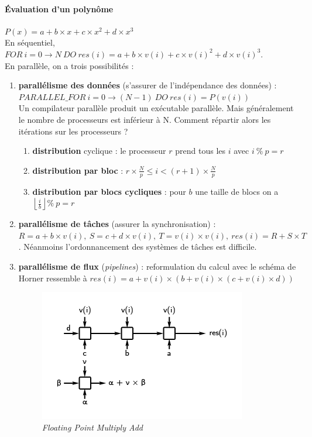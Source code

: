\documentclass[12pt, a4paper]{article}
\begin{document}
      \paragraph{Évaluation d'un polynôme} \(P(x) = a + b \times x + c \times
      x^2 + d \times x ^ 3\) \\
      En séquentiel, \(FOR\ i = 0 \rightarrow N\ DO\ res(i) = a + b \times v(i)
      + c \times v(i)^2 + d \times v(i)^3\). \\
      En parallèle, on a trois possibilités :
      \begin{enumerate}
        \item \textbf{parallélisme des données} (s'assurer de l'indépendance des
         données) : \(PARALLEL\_FOR\ i = 0 \rightarrow (N - 1)\ DO\ res(i) =
        P(v(i))\)\\
        Un compilateur parallèle produit un exécutable parallèle. Mais
        généralement le nombre de processeurs est inférieur à N. Comment
        répartir alors les itérations sur les processeurs ?
        \begin{enumerate}
          \item \textbf{distribution} cyclique : le processeur $r$ prend tous
          les $i$ avec $i\ \%\ p = r$
          \item \textbf{distribution par bloc} : $r \times \frac{N}{p} \leq i <
          (r + 1) \times \frac{N}{p}$
          \item \textbf{distribution par blocs cycliques} : pour $b$ une taille
          de blocs on a $\left \lfloor{\frac{i}{b}}\right \rfloor \%\ p = r$
        \end{enumerate}
        \item \textbf{parallélisme de tâches} (assurer la synchronisation) : $R
        = a + b \times v(i),\ S = c + d \times v(i),\ T = v(i) \times v(i),\
        res(i) = R + S \times T$. Néanmoins l'ordonnancement des systèmes de
        tâches est difficile.
        \item \textbf{parallélisme de flux} (\textit{pipelines}) : reformulation
         du calcul avec le schéma de Horner ressemble à $res(i) = a + v(i)
        \times (b + v(i) \times (c + v(i) \times d))$
        \begin{figure}[!ht]
          \centering
          \includegraphics{images/pflux.png}
          \caption{\textit{Floating Point Multiply Add}}
          \label{fig:mdistr}
        \end{figure}
      \end{enumerate}
\end{document}

